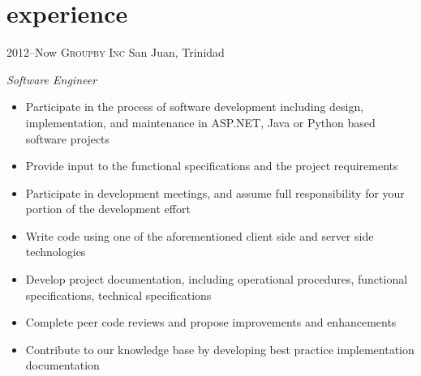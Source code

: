 \documentclass[]{friggeri-cv} %
\begin{document}

\section{experience}

\begin{entrylist}
\entry
{2012--Now}
{\textsc{Groupby Inc}}
{San Juan, Trinidad}
{\emph{Software Engineer} \\
\begin{itemize}
\item Participate in the process of software development including design, implementation, and maintenance in ASP.NET, Java or Python based software projects
\item Provide input to the functional specifications and the project requirements
\item Participate in development meetings, and assume full responsibility for your portion of the development effort
\item Write code using one of the aforementioned client side and server side technologies
\item Develop project documentation, including operational procedures, functional specifications, technical specifications
\item Complete peer code reviews and propose improvements and enhancements
\item Contribute to our knowledge base by developing best practice implementation documentation
\end{itemize}}
\end{entrylist}
\end{document}
